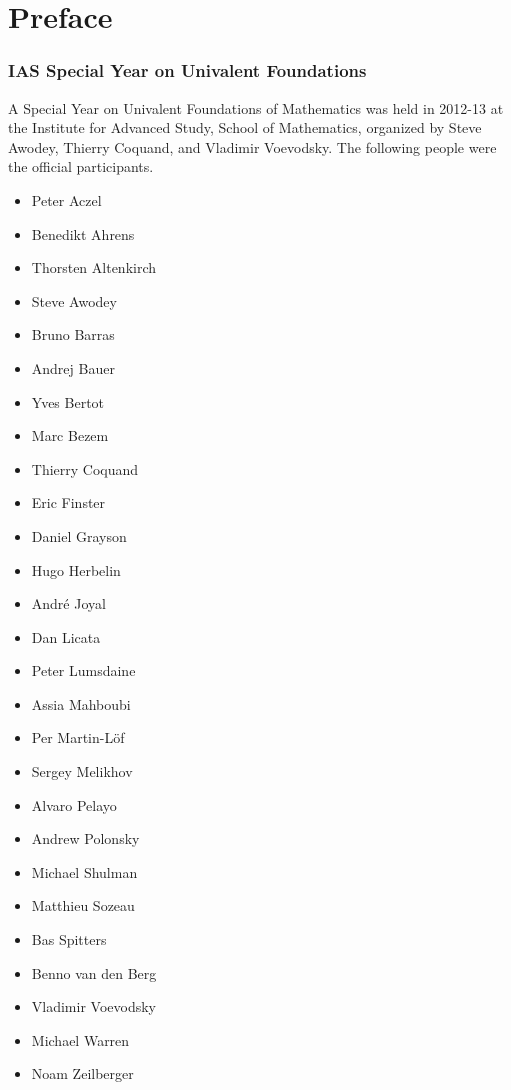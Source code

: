 \chapter*{Preface}
\label{cha:preface}

\subsection*{IAS Special Year on Univalent Foundations}

A Special Year on Univalent Foundations of Mathematics was held in 2012-13 at the Institute for Advanced Study, School of Mathematics, organized by Steve Awodey, Thierry Coquand, and Vladimir Voevodsky.  The following people were the official participants.

\begin{multicols}{\OPTprefacecols}{
\begin{itemize}
\item[] Peter Aczel
\item[] Benedikt Ahrens
\item[] Thorsten Altenkirch
\item[] Steve Awodey
\item[] Bruno Barras
\item[] Andrej Bauer
\item[] Yves Bertot
\item[] Marc Bezem
\item[] Thierry Coquand
\item[] Eric Finster
\item[] Daniel Grayson
\item[] Hugo Herbelin
\item[] Andr\'e Joyal
\item[] Dan Licata
\item[] Peter Lumsdaine
\item[] Assia Mahboubi
\item[] Per Martin-L\"of
\item[] Sergey Melikhov
\item[] Alvaro Pelayo
\item[] Andrew Polonsky
\item[] Michael Shulman
\item[] Matthieu Sozeau
\item[] Bas Spitters
\item[] Benno van den Berg
\item[] Vladimir Voevodsky
\item[] Michael Warren
\item[] Noam Zeilberger
\end{itemize}
}
\end{multicols}


